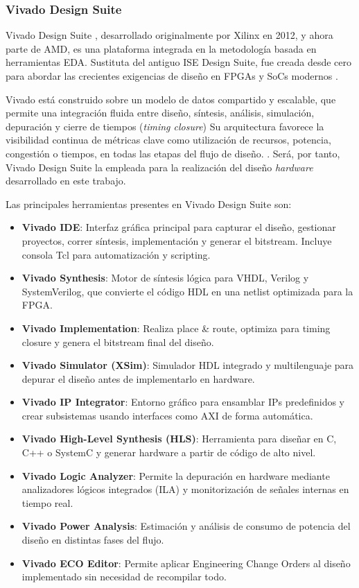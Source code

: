 \subsubsection{Vivado Design Suite}
\label{st:vivado}
Vivado Design Suite \cite{vivadoInfo}, desarrollado originalmente por Xilinx en 2012, y ahora parte de AMD, es una plataforma integrada en la metodología basada en herramientas EDA. Sustituta del antiguo ISE Design Suite, fue creada desde cero para abordar las crecientes exigencias de diseño en FPGAs y SoCs modernos \cite{vivadoHistoria_1}. 

Vivado está construido sobre un modelo de datos compartido y escalable, que permite una integración fluida entre diseño, síntesis, análisis, simulación, depuración y cierre de tiempos (\textit{timing closure}) Su arquitectura favorece la visibilidad continua de métricas clave como utilización de recursos, potencia, congestión o tiempos, en todas las etapas del flujo de diseño. \cite{vivadoRazones}. Será, por tanto, Vivado Design Suite la empleada para la realización del diseño \textit{hardware} desarrollado en este trabajo.

Las principales herramientas presentes en Vivado Design Suite son:

\begin{itemize}
    \item \textbf{Vivado IDE}: Interfaz gráfica principal para capturar el diseño, gestionar proyectos, correr síntesis, implementación y generar el bitstream. Incluye consola Tcl para automatización y scripting.
    \item \textbf{Vivado Synthesis}: Motor de síntesis lógica para VHDL, Verilog y SystemVerilog, que convierte el código HDL en una netlist optimizada para la FPGA.
    \item \textbf{Vivado Implementation}: Realiza place \& route, optimiza para timing closure y genera el bitstream final del diseño.
    \item \textbf{Vivado Simulator (XSim)}: Simulador HDL integrado y multilenguaje para depurar el diseño antes de implementarlo en hardware.
    \item \textbf{Vivado IP Integrator}: Entorno gráfico para ensamblar IPs predefinidos y crear subsistemas usando interfaces como AXI de forma automática.
    \item \textbf{Vivado High-Level Synthesis (HLS)}: Herramienta para diseñar en C, C++ o SystemC y generar hardware a partir de código de alto nivel.
    \item \textbf{Vivado Logic Analyzer}: Permite la depuración en hardware mediante analizadores lógicos integrados (ILA) y monitorización de señales internas en tiempo real.
    \item \textbf{Vivado Power Analysis}: Estimación y análisis de consumo de potencia del diseño en distintas fases del flujo.
    \item \textbf{Vivado ECO Editor}: Permite aplicar Engineering Change Orders al diseño implementado sin necesidad de recompilar todo.
\end{itemize}

